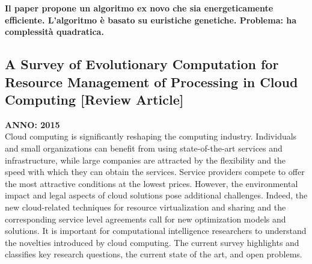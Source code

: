 \textbf{Il paper propone un algoritmo ex novo che sia energeticamente efficiente. L'algoritmo è basato su euristiche genetiche. Problema: ha complessità quadratica.}


\subsection{A Survey of Evolutionary Computation for Resource Management of Processing in Cloud Computing [Review Article]}
\textbf{ANNO: 2015}~\cite{7083783}\\
Cloud computing is significantly reshaping the computing industry. 
Individuals and small organizations can benefit from using state-of-the-art services and infrastructure,
while large companies are attracted by the flexibility and the speed with which they can obtain the services. 
Service providers compete to offer the most attractive conditions at the lowest prices. 
However, the environmental impact and legal aspects of cloud solutions pose additional challenges. 
Indeed, the new cloud-related techniques for resource virtualization and sharing and the corresponding service level agreements 
call for new optimization models and solutions. 
It is important for computational intelligence researchers to understand the novelties introduced by cloud computing. 
The current survey highlights and classifies key research questions, the current state of the art, and open problems.\\

